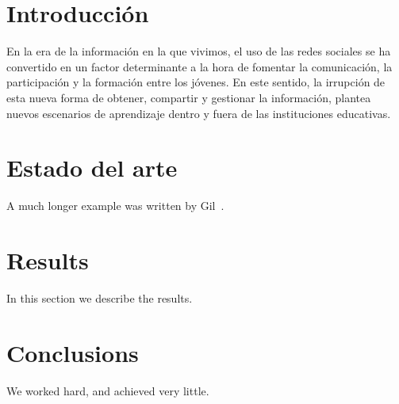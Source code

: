 \documentclass[12pt]{article}
\begin{document}
\maketitle

\begin{abstract}
Este trabajo tiene como objeto de estudio comprender la influencia de las interacciones entre los escenarios escolares y virtuales en los procesos de aprendizaje. As\'i pues, se ha llevado a cabo un estudio de caso de un alumno de ESO (Educaci\'on Secundaria Obligatoria) de 15 años de edad. Como herramientas de recogida de informaci\'on hemos utilizado las entrevistas en profundidad. Los resultados muestran el gran potencial que tienen las redes sociales para desarrollar el aprendizaje, la identidad y el capital social en los adolescentes.\\\\
Enlace al repositorio: \url{https://github.com/jmiguel22/proyecto_final.git}\\\\
\textbf{Palabras clave:} Aprendizaje, Redes sociales

\end{abstract}

\section{Introducci\'on}
En la era de la informaci\'on en la que vivimos, el uso de las redes sociales se ha convertido en un factor determinante a la hora de fomentar la comunicaci\'on, la participaci\'on y la formaci\'on entre los j\'ovenes. En este sentido, la irrupci\'on de esta nueva forma de obtener, compartir y gestionar la informaci\'on, plantea nuevos escenarios de aprendizaje dentro y fuera de las instituciones educativas. 

\section{Estado del arte}
A much longer \LaTeXe{} example was written by Gil~\cite{Gil:02}.

\section{Results}\label{results}
In this section we describe the results.

\section{Conclusions}\label{conclusions}
We worked hard, and achieved very little.



\end{document}

